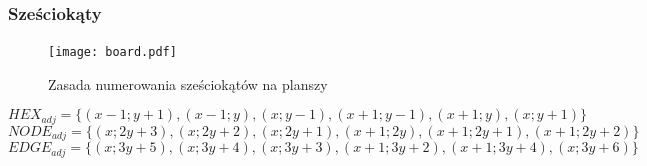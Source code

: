 \documentclass[a4paper,12pt]{article}
\begin{document}
\subsubsection{Sześciokąty}



\begin{figure}[ht]
  \begin{center}
    \texttt{[image: board.pdf]}
  \end{center}
  \caption{Zasada numerowania sześciokątów na planszy}
  \label{board}
\end{figure}

\begin{equation}
  HEX_{adj}=\{
  (x-1; y+1),
  (x-1; y),
  (x; y-1),
  (x+1; y-1),
  (x+1; y),
  (x; y+1)
  \}
  \label{hexhexes}
\end{equation}
\begin{equation}
  NODE_{adj}=\{
  (x; 2y+3),
  (x; 2y+2),
  (x; 2y+1),
  (x+1; 2y),
  (x+1; 2y+1),
  (x+1; 2y+2)
  \}
  \label{nodehexes}
\end{equation}
\begin{equation}
  EDGE_{adj}=\{
  (x; 3y+5),
  (x; 3y+4),
  (x; 3y+3),
  (x+1; 3y+2),
  (x+1; 3y+4),
  (x; 3y+6)
  \}
  \label{edgehexes}
\end{equation}
\end{document}
